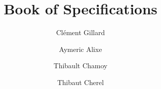 \documentclass[twoside,12pt]{report}	%
\title{Book of Specifications}
\author{Clément Gillard
	\and Aymeric Alixe
	\and Thibault Chamoy
	\and Thibaut Cherel}
\begin{document}
	

	\newpage

	\tableofcontents

	\newpage
	\phantom{}
	\newpage
	
	
	
	
	
	
	
	

	

	
\end{document}
